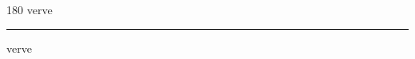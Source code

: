 
\begin{frame}
\begin{center}
\begin{turn}{180}
{\fontsize{2.5cm}{1em}\selectfont verve}
\end{turn}
\vspace{1em}\par  
\hrule
\vspace{1em}\par  
{\fontsize{2.5cm}{1em}\selectfont verve}
\end{center}
\end{frame}
